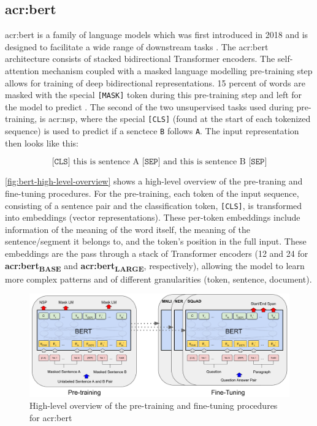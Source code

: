 \subsection[BERT]{\acrshort{acr:bert}}

\gls{acr:bert} is a family of language models which was first introduced in 2018 and is designed to facilitate a wide range of downstream tasks \citep[5]{devlinBERTPretrainingDeep2019}. The \acrshort{acr:bert} architecture consists of stacked bidirectional Transformer encoders. The self-attention mechanism coupled with a masked language modelling pre-training step allows for training of deep bidirectional representations. 15 percent of words are masked with the special \texttt{[MASK]} token during this pre-training step and left for the model to predict \citep[4]{devlinBERTPretrainingDeep2019}. The second of the two unsupervised tasks used during pre-training, is \gls{acr:nsp}, where the special \texttt{[CLS]} (found at the start of each tokenized sequence) is used to predict if a senctece \texttt{B} follows \texttt{A}. The input representation then looks like this:

$$
    \texttt{[CLS]}\text{ this is sentence A }\texttt{[SEP]}\text{ and this is sentence B }\texttt{[SEP]}
$$

\autoref{fig:bert-high-level-overview} shows a high-level overview of the pre-traning and fine-tuning procedures. For the pre-training, each token of the input sequence, consisting of a sentence pair and the classification token, \texttt{[CLS]}, is transformed into embeddings (vector representations). These per-token embeddings include information of the meaning of the word itself, the meaning of the sentence/segment it belongs to, and the token's position in the full input. These embeddings are the pass through a stack of Transformer encoders (12 and 24 for \textbf{\acrshort{acr:bert}\textsubscript{BASE}} and \textbf{\acrshort{acr:bert}\textsubscript{LARGE}}, respectively), allowing the model to learn more complex patterns and of different granularities (token, sentence, document).

\begin{figure}
    \centering
    \includegraphics*[width=\textwidth]{./figs/BERT_overall_procedures.jpg}
    \caption{High-level overview of the pre-training and fine-tuning procedures for \acrshort{acr:bert} \citep[3]{devlinBERTPretrainingDeep2019}}
    \label{fig:bert-high-level-overview}
\end{figure}


